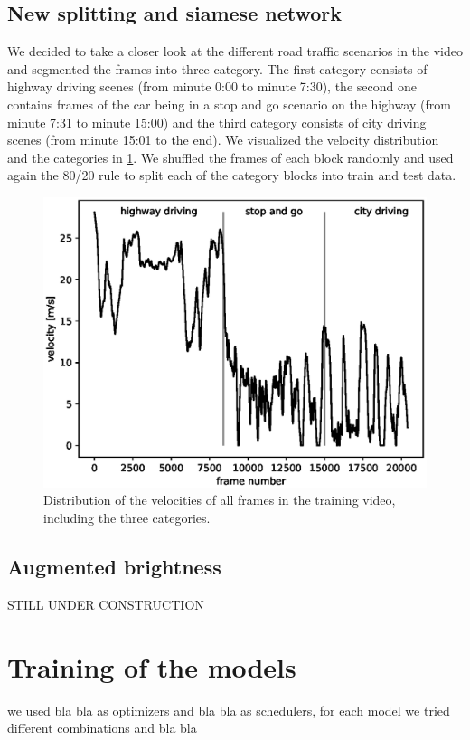 \documentclass[conference]{IEEEtran}
\begin{document}
\subsection{New splitting and siamese network}
We decided to take a closer look at the different road traffic scenarios in the video and segmented the 
frames into three category. The first category
consists of highway driving scenes (from minute 0:00 to minute 7:30), the second one contains frames of 
the car being
in a stop and go scenario on the highway (from minute 7:31 to minute 15:00) and the third category 
consists of
city driving scenes (from minute 15:01 to the end). We visualized the velocity distribution and the 
categories in 
\cref{fig:SpeedPerFrameDistributionNewSplitting}. 
We shuffled the frames of each block randomly and used again the 80/20 rule to split each of the 
category blocks into train and test data.
\begin{figure}[h]
\centering
\includegraphics[scale=0.6]{./imgs/plot_speed_time_new_splitting.eps}
\caption{Distribution of the velocities of all frames in the training video, including the three categories.}
\label{fig:SpeedPerFrameDistributionNewSplitting}
\end{figure}
\subsection{Augmented brightness}
STILL UNDER CONSTRUCTION
\section{Training of the models}
we used bla bla as optimizers and bla bla as schedulers, for each model we tried different combinations and bla bla
\end{document}
